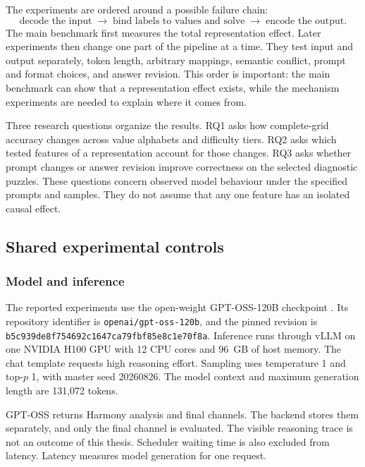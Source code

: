 \documentclass[11pt,a4paper]{article}
\begin{document}
The experiments are ordered around a possible failure chain:
\begin{equation}
\text{decode the input}\;\longrightarrow\;\text{bind labels to values and solve}\;\longrightarrow\;\text{encode the output}.
\end{equation}
The main benchmark first measures the total representation effect.  Later experiments then change one part of the pipeline at a time.  They test input and output separately, token length, arbitrary mappings, semantic conflict, prompt and format choices, and answer revision.  This order is important: the main benchmark can show that a representation effect exists, while the mechanism experiments are needed to explain where it comes from.

Three research questions organize the results. RQ1 asks how complete-grid accuracy changes across value alphabets and difficulty tiers. RQ2 asks which tested features of a representation account for those changes. RQ3 asks whether prompt changes or answer revision improve correctness on the selected diagnostic puzzles. These questions concern observed model behaviour under the specified prompts and samples. They do not assume that any one feature has an isolated causal effect.

\subsection{Shared experimental controls}
\subsubsection{Model and inference}
The reported experiments use the open-weight GPT-OSS-120B checkpoint \citep{openai2025gptoss}.  Its repository identifier is \texttt{openai/\allowbreak gpt-oss-120b}, and the pinned revision is \texttt{b5c939de\allowbreak8f754692\allowbreak c1647ca7\allowbreak9fbf85e8\allowbreak c1e70f8a}.  Inference runs through vLLM on one NVIDIA H100 GPU with 12 CPU cores and 96~GB of host memory.  The chat template requests high reasoning effort.  Sampling uses temperature 1 and top-$p$ 1, with master seed 20260826.  The model context and maximum generation length are 131,072 tokens.

GPT-OSS returns Harmony analysis and final channels.  The backend stores them separately, and only the final channel is evaluated.  The visible reasoning trace is not an outcome of this thesis.  Scheduler waiting time is also excluded from latency. Latency measures model generation for one request.
\end{document}
